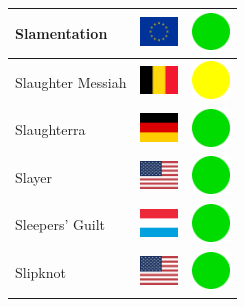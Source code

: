 \documentclass[12pt, a4paper, twoside]{report}
\begin{document}
\begin{center}
\begin{longtable}{|p{5cm}|p{2cm}|p{2cm}|}
 Slamentation                                               & \includegraphics[width=1cm]{../4x3/eu} &   \includegraphics[width=1cm]{../likes/y} \\ \hline
 Slaughter Messiah                                          & \includegraphics[width=1cm]{../4x3/be} &   \includegraphics[width=1cm]{../likes/m} \\ \hline
 Slaughterra                                                & \includegraphics[width=1cm]{../4x3/de} &   \includegraphics[width=1cm]{../likes/y} \\ \hline
 Slayer                                                     & \includegraphics[width=1cm]{../4x3/us} &   \includegraphics[width=1cm]{../likes/y} \\ \hline
 Sleepers' Guilt                                            & \includegraphics[width=1cm]{../4x3/lu} &   \includegraphics[width=1cm]{../likes/y} \\ \hline
 Slipknot                                                   & \includegraphics[width=1cm]{../4x3/us} &   \includegraphics[width=1cm]{../likes/y} \\ \hline

\end{longtable}
\end{center}
\end{document}
